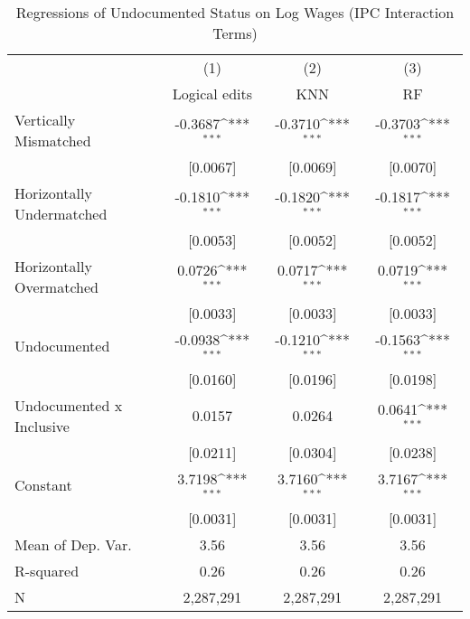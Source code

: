 \begin{table}[htbp]\centering
\def\sym#1{\ifmmode^{#1}\else\(^{#1}\)\fi}
\caption{Regressions of Undocumented Status on Log Wages (IPC Interaction Terms)}
\begin{tabular}{l*{3}{c}}
\toprule
                    &\multicolumn{1}{c}{(1)}         &\multicolumn{1}{c}{(2)}         &\multicolumn{1}{c}{(3)}         \\
                    &Logical edits         &         KNN         &          RF         \\
\midrule
Vertically Mismatched&     -0.3687\sym{***}&     -0.3710\sym{***}&     -0.3703\sym{***}\\
                    &    [0.0067]         &    [0.0069]         &    [0.0070]         \\
\addlinespace
Horizontally Undermatched&     -0.1810\sym{***}&     -0.1820\sym{***}&     -0.1817\sym{***}\\
                    &    [0.0053]         &    [0.0052]         &    [0.0052]         \\
\addlinespace
Horizontally Overmatched&      0.0726\sym{***}&      0.0717\sym{***}&      0.0719\sym{***}\\
                    &    [0.0033]         &    [0.0033]         &    [0.0033]         \\
\addlinespace
Undocumented        &     -0.0938\sym{***}&     -0.1210\sym{***}&     -0.1563\sym{***}\\
                    &    [0.0160]         &    [0.0196]         &    [0.0198]         \\
\addlinespace
Undocumented x Inclusive&      0.0157         &      0.0264         &      0.0641\sym{***}\\
                    &    [0.0211]         &    [0.0304]         &    [0.0238]         \\
\addlinespace
Constant            &      3.7198\sym{***}&      3.7160\sym{***}&      3.7167\sym{***}\\
                    &    [0.0031]         &    [0.0031]         &    [0.0031]         \\
\midrule
Mean of Dep. Var.   &        3.56         &        3.56         &        3.56         \\
R-squared           &        0.26         &        0.26         &        0.26         \\
N                   &   2,287,291         &   2,287,291         &   2,287,291         \\
\bottomrule

\end{tabular}
\end{table}
